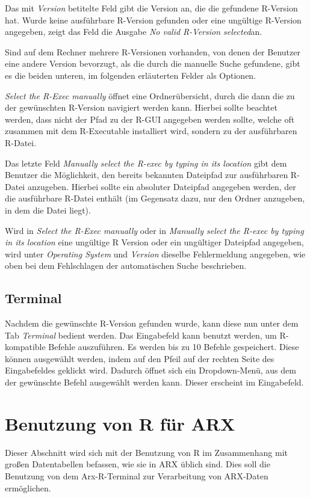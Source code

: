 \documentclass[a4paper, 12pt]{report} %
\begin{document}
Das mit \textit{Version} betitelte Feld gibt die Version an, die die gefundene R-Version hat. Wurde keine ausführbare R-Version gefunden oder eine ungültige R-Version angegeben, zeigt das Feld die Ausgabe \textit{No valid R-Version selected}an. 

Sind auf dem Rechner mehrere R-Versionen vorhanden, von denen der Benutzer eine andere Version bevorzugt, als die durch die manuelle Suche gefundene, gibt es die beiden unteren, im folgenden erläuterten Felder als Optionen. 

\textit{Select the R-Exec manually} öffnet eine Ordnerübersicht, durch die dann die zu der gewünschten R-Version navigiert werden kann. Hierbei sollte beachtet werden, dass nicht der Pfad zu der R-GUI angegeben werden sollte, welche oft zusammen mit dem R-Executable installiert wird, sondern zu der ausführbaren R-Datei.
  
Das letzte Feld \textit{Manually select the R-exec by typing in its location} gibt dem Benutzer die Möglichkeit, den bereits bekannten Dateipfad zur ausführbaren R-Datei anzugeben. Hierbei sollte ein absoluter Dateipfad angegeben werden, der die ausführbare R-Datei enthält (im Gegensatz dazu, nur den Ordner anzugeben, in dem die Datei liegt). 

Wird in \textit{Select the R-Exec manually} oder in \textit{Manually select the R-exec by typing in its location} eine ungültige R Version oder ein ungültiger Dateipfad angegeben, wird unter \textit{Operating System} und \textit{Version} dieselbe Fehlermeldung angegeben, wie oben bei dem Fehlschlagen der automatischen Suche beschrieben.

\subsection{Terminal}
Nachdem die gewünschte R-Version gefunden wurde, kann diese nun unter dem Tab \textit{Terminal} bedient werden. Das Eingabefeld kann benutzt werden, um R-kompatible Befehle auszuführen. Es werden bis zu 10 Befehle gespeichert. Diese können ausgewählt werden, indem auf den Pfeil auf der rechten Seite des Eingabefeldes geklickt wird. Dadurch öffnet sich ein Dropdown-Menü, aus dem der gewünschte Befehl ausgewählt werden kann. Dieser erscheint im Eingabefeld. 


\section{Benutzung von R für ARX }
Dieser Abschnitt wird sich mit der Benutzung von R im Zusammenhang mit großen Datentabellen befassen, wie sie in ARX üblich sind. Dies soll die Benutzung von dem Arx-R-Terminal zur Verarbeitung von ARX-Daten ermöglichen. 
\end{document}

